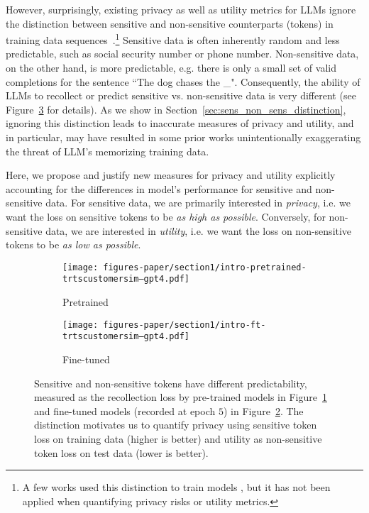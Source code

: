 However, surprisingly, existing privacy as well as utility metrics for LLMs ignore the distinction between sensitive and non-sensitive counterparts (tokens) in training data sequences~\cite{carlini2023quantifying,mireshghallah-etal-2022-quantifying,biderman2024emergent}.\footnote{A few works used this distinction to train models \cite{shi-etal-2022-selective,zhao-etal-2022-provably}, but it has not been applied when quantifying privacy risks or utility metrics.}
%
Sensitive data is often inherently random and less predictable, such as social security number or phone number. 
%
Non-sensitive data, on the other hand, is more predictable, e.g. there is only a small set of valid completions for the sentence ``The dog chases the \_". 
%
Consequently, the ability of LLMs to recollect or predict sensitive vs. non-sensitive data is very different (see Figure~\ref{fig:illustrative_example} for details).
%
As we show in Section~\ref{sec:sens_non_sens_distinction}, ignoring this distinction leads to inaccurate measures of privacy and utility, and in particular, may have resulted in some prior works unintentionally exaggerating the threat of LLM's memorizing training data\cite{biderman2024emergent,carlini2021extractingtrainingdatalarge,carlini2023quantifying}.
%

Here, we propose and justify new measures for privacy and utility explicitly accounting for the differences in model's performance for sensitive and non-sensitive data.
%
For sensitive data, we are primarily interested in \emph{privacy}, i.e. we want the loss on sensitive tokens to be \emph{as high as possible}.
%
Conversely, for non-sensitive data, we are interested in \emph{utility}, i.e. we want the loss on non-sensitive tokens to be \emph{as low as possible}.
%

\begin{figure}[]
    \centering
        \begin{subfigure}{.48\linewidth}
       \texttt{[image: figures-paper/section1/intro-pretrained-trtscustomersim--gpt4.pdf]}
        \caption{Pretrained}
        \label{fig:a}
    \end{subfigure}
    \begin{subfigure}{.48\linewidth}
    \texttt{[image: figures-paper/section1/intro-ft-trtscustomersim--gpt4.pdf]}
        \caption{Fine-tuned}
        \label{fig:b}
    \end{subfigure}
    \caption{
    Sensitive and non-sensitive tokens have different predictability, measured as the recollection loss by pre-trained  models in Figure~\ref{fig:a} and fine-tuned models (recorded at epoch $5$) in Figure~\ref{fig:b}. The distinction motivates us to quantify privacy using sensitive token loss on training data (higher is better) and utility as non-sensitive token loss on test data (lower is better).
    }
    \label{fig:illustrative_example}
\end{figure}


